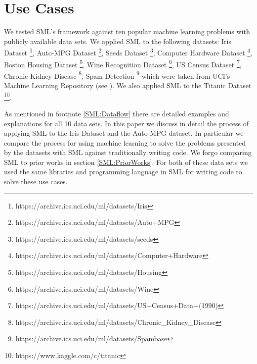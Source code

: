 \section{Use Cases}
\label{use-cases}

We tested SML's framework against ten popular machine learning problems with publicly available data sets. We applied SML to the following datasets: Iris Dataset \footnote{https://archive.ics.uci.edu/ml/datasets/Iris}, Auto-MPG Dataset \footnote{https://archive.ics.uci.edu/ml/datasets/Auto+MPG}, Seeds Dataset \footnote{https://archive.ics.uci.edu/ml/datasets/seeds},  Computer Hardware Dataset \footnote{https://archive.ics.uci.edu/ml/datasets/Computer+Hardware},  Boston Housing Dataset \footnote{https://archive.ics.uci.edu/ml/datasets/Housing}, Wine Recognition Dataset \footnote{https://archive.ics.uci.edu/ml/datasets/Wine}, US Census Dataset \footnote{https://archive.ics.uci.edu/ml/datasets/US+Census+Data+(1990)}, Chronic Kidney Disease \footnote{https://archive.ics.uci.edu/ml/datasets/Chronic\_Kidney\_Disease}, Spam Detection \footnote{https://archive.ics.uci.edu/ml/datasets/Spambase} which were taken from UCI's Machine Learning Repository (see \cite{Lichman:2013}).  We also applied SML to the Titanic Dataset \footnote{https://www.kaggle.com/c/titanic}.  

As mentioned in footnote \ref{SML:Dataflow} there are detailed examples and explanations for all 10 data sets.  In this paper we discuss in detail the process of applying SML to the Iris Dataset and the Auto-MPG dataset.   In particular we compare the process for using machine learning to solve the problems presented by the datasets with SML against traditionally writing code.  We forgo comparing SML to prior works in section \ref{SML:PriorWorks}.  For both of these data sets we used the same libraries and programming language in SML for writing code to solve these use cases. 

